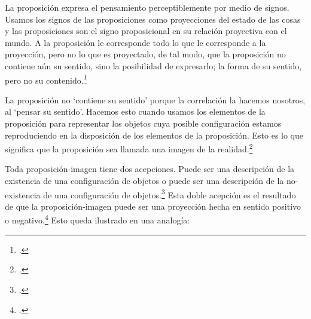       La proposición expresa el pensamiento perceptiblemente por medio de signos.
      Usamos los signos de las proposiciones como proyecciones del estado de las cosas
      y las proposiciones son el signo proposicional en su relación proyectiva con el
      mundo. A la proposición le corresponde todo lo que le corresponde a la
      proyección, pero no lo que es proyectado, de tal modo, que la proposición no
      contiene aún su sentido, sino la posibilidad de expresarlo; la forma de su
      sentido, pero no su contenido.\footcite[cf.~][3.1,3.11-3.13]{tractatus} 

      La proposición no `contiene su sentido' porque la correlación la hacemos nosotros,
      al `pensar su sentido'. Hacemos esto cuando usamos los elementos de la
      proposición para representar los objetos cuya posible configuración estamos 
      reproduciendo en la disposición de los elementos de la proposición. Esto es lo
      que significa que la proposición sea llamada una imagen de la
      realidad.\footcite[cf.~][p.69]{IWT}  

      Toda proposición-imagen tiene dos acepciones. Puede ser una descripción de
      la existencia de una configuración de objetos o puede ser una descripción de la
      no-existencia de una configuración de objetos.\footcite[cf.~][p.~72]{IWT} 
      Esta doble acepción es el resultado de que la proposición-imagen puede ser una
      proyección hecha en sentido positivo o negativo.\footcite[cf.~][p.~74]{IWT} Esto
      queda ilustrado en una analogía:


